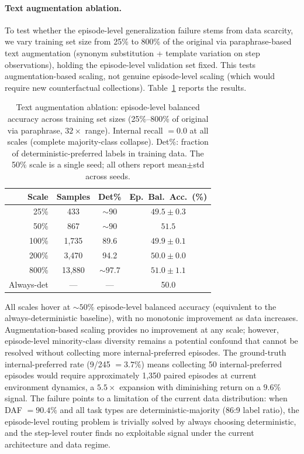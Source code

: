 \documentclass[11pt]{article}
\begin{document}
\paragraph{Text augmentation ablation.} To test whether the episode-level generalization failure stems from data scarcity, we vary training set size from 25\% to 800\% of the original via paraphrase-based text augmentation (synonym substitution + template variation on step observations), holding the episode-level validation set fixed. This tests augmentation-based scaling, not genuine episode-level scaling (which would require new counterfactual collections). Table~\ref{tab:text-augmentation} reports the results.

\begin{table}[h]
\centering
\small
\begin{tabular}{@{}rccc@{}}
\toprule
Scale & Samples & Det\% & Ep.\ Bal.\ Acc.\ (\%) \\
\midrule
25\% & 433 & ${\sim}90$ & $49.5 \pm 0.3$ \\
50\% & 867 & ${\sim}90$ & $51.5$ \\
100\% & 1{,}735 & 89.6 & $49.9 \pm 0.1$ \\
200\% & 3{,}470 & 94.2 & $50.0 \pm 0.0$ \\
800\% & 13{,}880 & ${\sim}97.7$ & $51.0 \pm 1.1$ \\
\midrule
Always-det & --- & --- & 50.0 \\
\bottomrule
\end{tabular}
\caption{Text augmentation ablation: episode-level balanced accuracy across training set sizes (25\%--800\% of original via paraphrase, $32{\times}$ range). Internal recall $= 0.0$ at all scales (complete majority-class collapse). Det\%: fraction of deterministic-preferred labels in training data. The 50\% scale is a single seed; all others report mean$\pm$std across seeds.}
\label{tab:text-augmentation}
\end{table}

All scales hover at ${\sim}50\%$ episode-level balanced accuracy (equivalent to the always-deterministic baseline), with no monotonic improvement as data increases. Augmentation-based scaling provides no improvement at any scale; however, episode-level minority-class diversity remains a potential confound that cannot be resolved without collecting more internal-preferred episodes. The ground-truth internal-preferred rate (9/245 $= 3.7\%$) means collecting 50 internal-preferred episodes would require approximately 1{,}350 paired episodes at current environment dynamics, a $5.5{\times}$ expansion with diminishing return on a $9.6\%$ signal. The failure points to a limitation of the current data distribution: when DAF $= 90.4\%$ and all task types are deterministic-majority (86:9 label ratio), the episode-level routing problem is trivially solved by always choosing deterministic, and the step-level router finds no exploitable signal under the current architecture and data regime.
\end{document}
